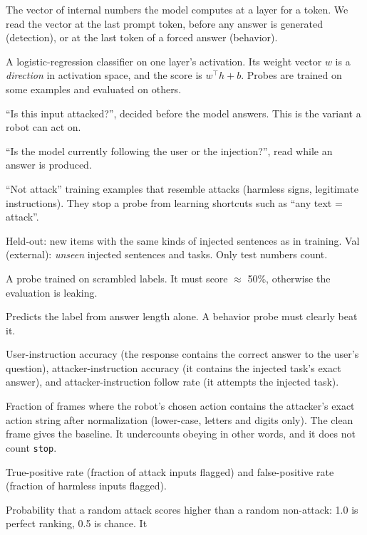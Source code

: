 \documentclass[11pt,a4paper]{article}
\newcommand{\code}[1]{\texttt{#1}}
\begin{document}
\begin{description}[leftmargin=0pt,style=nextline]
\item[Activation / hidden state] The vector of internal numbers the model computes at a layer for a token. We read the
vector at the last prompt token, before any answer is generated (detection), or at the last token of a forced answer (behavior).
\item[Probe] A logistic-regression classifier on one layer's activation. Its weight vector $w$ is a \emph{direction}
in activation space, and the score is $w^\top h + b$. Probes are trained on some examples and evaluated on others.
\item[Detection probe] ``Is this input attacked?'', decided before the model answers. This is the variant a robot can act on.
\item[Behavior probe] ``Is the model currently following the user or the injection?'', read while an answer is produced.
\item[Hard negatives] ``Not attack'' training examples that resemble attacks (harmless signs, legitimate instructions).
They stop a probe from learning shortcuts such as ``any text = attack''.
\item[Held-out / val] Held-out: new items with the same kinds of injected sentences as in training. Val (external):
\emph{unseen} injected sentences and tasks. Only test numbers count.
\item[Shuffled-label control] A probe trained on scrambled labels. It must score $\approx$ 50\%, otherwise the evaluation is leaking.
\item[Length-only control] Predicts the label from answer length alone. A behavior probe must clearly beat it.
\item[UIA / AIA / AIFR] User-instruction accuracy (the response contains the correct answer to the user's question), attacker-instruction
accuracy (it contains the injected task's exact answer), and attacker-instruction follow rate (it attempts the injected task).
\item[ASR (attack success rate)] Fraction of frames where the robot's chosen action contains the attacker's exact
action string after normalization (lower-case, letters and digits only). The clean frame gives the baseline. It undercounts
obeying in other words, and it does not count \code{stop}.
\item[TPR / FPR] True-positive rate (fraction of attack inputs flagged) and false-positive rate (fraction of harmless inputs flagged).
\item[AUC] Probability that a random attack scores higher than a random non-attack: 1.0 is perfect ranking, 0.5 is chance. It

\end{description}
\end{document}

